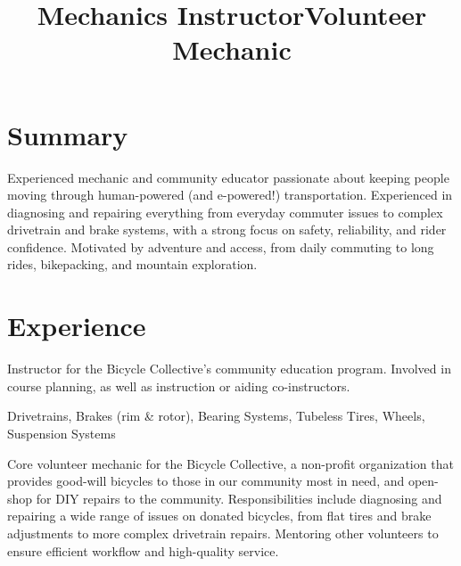 \documentclass[resmargin, centered, 10pt]{../res}
\begin{document}
\address{\href{mailto:kirkwood.donavin@gmail.com}{Kirkwood.Donavin@Gmail.com}}
\address{+1 (801) 554-6834}
\address{}
\address{}

\begin{resume}
    
\fullline

\section{Summary}

Experienced mechanic and community educator passionate about keeping people moving through human-powered (and e-powered!) transportation. Experienced in diagnosing and repairing everything from everyday commuter issues to complex drivetrain and brake systems, with a strong focus on safety, reliability, and rider confidence. Motivated by adventure and access, from daily commuting to long rides, bikepacking, and mountain exploration.

\fullline

\section{Experience}

\title{Mechanics Instructor}
\begin{position}
	Instructor for the Bicycle Collective's community education program. Involved in course planning, as well as instruction or aiding co-instructors. 
	
	 Drivetrains, Brakes (rim \& rotor), Bearing Systems, Tubeless Tires, Wheels, Suspension Systems
\end{position}

\title{Volunteer Mechanic}
\begin{position}
	Core volunteer mechanic for the Bicycle Collective, a non-profit organization that provides good-will bicycles to those in our community most in need, and open-shop for DIY repairs to the community. Responsibilities include diagnosing and repairing a wide range of issues on donated bicycles, from flat tires and brake adjustments to more complex drivetrain repairs. Mentoring other volunteers to ensure efficient workflow and high-quality service.
\end{position}


\end{resume}
\end{document}

